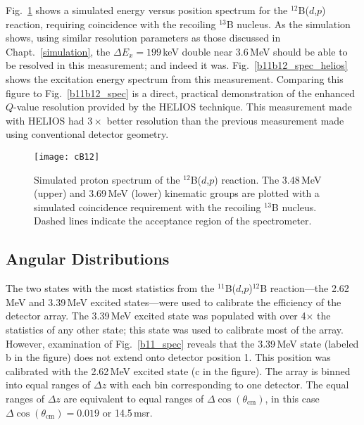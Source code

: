 Fig.~\ref{b12_spec} shows a simulated energy versus position spectrum for the $^{12}$B($d$,$p$) reaction, requiring coincidence with the recoiling $^{13}$B nucleus.  As the simulation shows, using similar resolution parameters as those discussed in Chapt.~\ref{simulation}, the $\Delta E_x=199$\,keV double near 3.6\,MeV should be able to be resolved in this measurement; and indeed it was.  Fig.~\ref{b11b12_spec_helios} shows the excitation energy spectrum from this measurement.  Comparing this figure to Fig.~\ref{b11b12_spec} is a direct, practical demonstration of the enhanced $Q$-value resolution provided by the HELIOS technique.  This measurement made with HELIOS had $3\times$ better resolution than the previous measurement made using conventional detector geometry.

\begin{figure}[t]
\centering
\texttt{[image: cB12]}%
\caption[Simulated proton spectrum of the $^{12}$B($d$,$p$) reaction. ]{Simulated proton spectrum of the $^{12}$B($d$,$p$) reaction.  The 3.48\,MeV (upper) and 3.69\,MeV (lower) kinematic groups are plotted with a simulated coincidence requirement with the recoiling $^{13}$B nucleus.  Dashed lines indicate the acceptance region of the spectrometer.}%
\label{b12_spec}%
\end{figure}

\subsection{Angular Distributions}\label{b12_ang}
The two states with the most statistics from the $^{11}$B($d$,$p$)$^{12}$B reaction---the 2.62\,MeV and 3.39\,MeV excited states---were used to calibrate the efficiency of the detector array.  The 3.39\,MeV excited state was populated with over 4$\times$ the statistics of any other state; this state was used to calibrate most of the array.  However, examination of Fig.~\ref{b11_spec} reveals that the 3.39\,MeV state (labeled b in the figure) does not extend onto detector position 1.  This position was calibrated with the 2.62\,MeV excited state (c in the figure).    The array is binned into equal ranges of $\Delta z$ with each bin corresponding to one detector.  The equal ranges of $\Delta z$ are equivalent to equal ranges of $\Delta \cos(\theta_\mathrm{cm})$, in this case $\Delta \cos(\theta_\mathrm{cm})=0.019$ or 14.5\,msr.%

